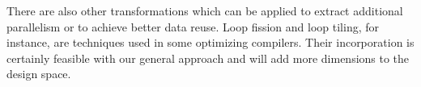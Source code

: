 There are also other transformations which can be applied to extract additional parallelism or to achieve better data reuse. Loop fission and loop tiling, for instance, are techniques used in some optimizing compilers. 
Their incorporation is certainly feasible with our general approach and will
add more dimensions to the design space. 



